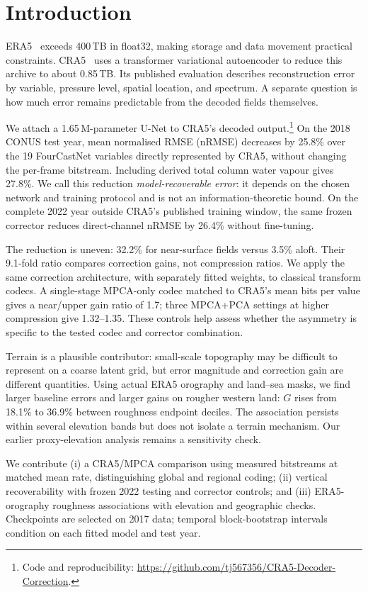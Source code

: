 \section{Introduction}
\label{sec:intro}

ERA5~\cite{hersbach2020} exceeds 400\,TB in float32, making storage and data
movement practical constraints. CRA5~\cite{han2024,cra5journal} uses a transformer
variational autoencoder to reduce this archive to about 0.85\,TB. Its published
evaluation describes reconstruction error by variable, pressure level, spatial
location, and spectrum. A separate question is how much error remains predictable
from the decoded fields themselves.

We attach a 1.65\,M-parameter U-Net to CRA5's decoded output.\footnote{Code and reproducibility: \url{https://github.com/tj567356/CRA5-Decoder-Correction}.}
On the 2018 CONUS test year, mean normalised RMSE (nRMSE) decreases by 25.8\% over the 19
FourCastNet variables directly represented by CRA5, without changing the
per-frame bitstream. Including derived total column water vapour gives 27.8\%.
We call this reduction \emph{model-recoverable error}: it depends on the chosen
network and training protocol and is not an information-theoretic bound.
On the complete 2022 year outside CRA5's published training window, the same
frozen corrector reduces direct-channel nRMSE by 26.4\% without fine-tuning.

The reduction is uneven: 32.2\% for near-surface fields versus 3.5\% aloft.
Their 9.1-fold ratio compares correction gains, not compression ratios. We apply
the same correction architecture, with separately fitted weights, to classical
transform codecs. A single-stage MPCA-only codec matched to CRA5's mean bits per
value gives a near/upper gain ratio of 1.7; three MPCA+PCA settings at higher
compression give 1.32--1.35. These controls help assess whether the asymmetry is
specific to the tested codec and corrector combination.

Terrain is a plausible contributor: small-scale topography may be difficult
to represent on a coarse latent grid, but error magnitude and correction gain
are different quantities. Using actual ERA5 orography and land--sea masks, we
find larger baseline errors and larger gains on rougher western land: $G$ rises
from 18.1\% to 36.9\% between roughness endpoint deciles. The association
persists within several elevation bands but does not isolate a terrain mechanism.
Our earlier proxy-elevation analysis remains a sensitivity check.

We contribute (i) a CRA5/MPCA comparison using measured bitstreams at
matched mean rate, distinguishing global and regional coding; (ii) vertical
recoverability with frozen 2022 testing and corrector controls; and (iii)
ERA5-orography roughness associations with elevation and geographic checks.
Checkpoints are selected on 2017 data; temporal block-bootstrap intervals
condition on each fitted model and test year.

